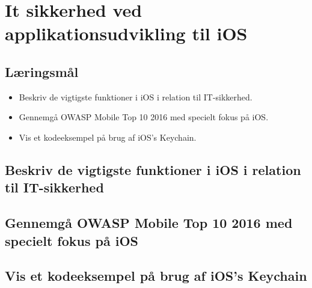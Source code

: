 \section{It sikkerhed ved applikationsudvikling til iOS}

\subsection{Læringsmål}

\begin{itemize}
	\item Beskriv de vigtigste funktioner i iOS i relation til IT-sikkerhed.
	\item Gennemgå OWASP Mobile Top 10 2016 med specielt fokus på iOS.
	\item Vis et kodeeksempel på brug af iOS’s Keychain.
\end{itemize}

\subsection{Beskriv de vigtigste funktioner i iOS i relation til IT-sikkerhed}
\subsection{Gennemgå OWASP Mobile Top 10 2016 med specielt fokus på iOS}
\subsection{Vis et kodeeksempel på brug af iOS’s Keychain}
